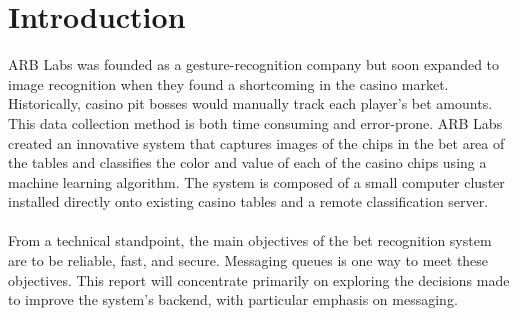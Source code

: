 \documentclass[12pt]{report}
\begin{document}
\section*{Introduction}
\par\indent
ARB Labs was founded as a gesture-recognition company but soon expanded to image recognition when they found a shortcoming in the casino market. Historically, casino pit bosses would manually track each player's bet amounts. This data collection method is both time consuming and error-prone. ARB Labs created an innovative system that captures images of the chips in the bet area of the tables and  classifies the color and value of each of the casino chips using a machine learning algorithm. The system is composed of a small computer cluster installed directly onto existing casino tables and a remote classification server.\\ \\ \noindent
From a technical standpoint, the main objectives of the bet recognition system are to be reliable, fast, and secure. Messaging queues is one way to meet these objectives. This report will concentrate primarily on exploring the decisions made to improve the system's backend, with particular emphasis on messaging. \\ \par\noindent

\newpage\thispagestyle{fancy}\sectionfont{\scshape}
\end{document}

